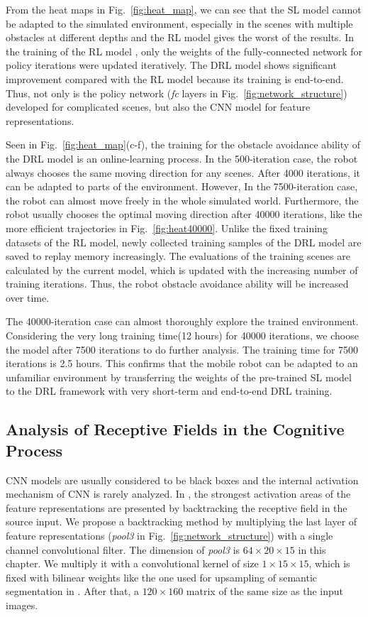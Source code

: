 From the heat maps in Fig.~\ref{fig:heat_map}, we can see that the SL model cannot be adapted to the simulated environment, especially in the scenes with multiple obstacles at different depths and the RL model gives the worst of the results. In the training of the RL model \cite{tl_rcar_2016}, only the weights of the fully-connected network for policy iterations were updated iteratively. The DRL model shows significant improvement compared with the RL model because its training is end-to-end. Thus, not only is the policy network (\textit{fc} layers in Fig.~\ref{fig:network_structure}) developed for complicated scenes, but also the CNN model for feature representations.


Seen in Fig.~\ref{fig:heat_map}(c-f), the training for the obstacle avoidance ability of the DRL model is an online-learning process. In the 500-iteration case, the robot always chooses the same moving direction for any scenes. After 4000 iterations, it can be adapted to parts of the environment. However, In the 7500-iteration case, the robot can almost move freely in the whole simulated world. Furthermore, the robot usually chooses the optimal moving direction after 40000 iterations, like the more efficient trajectories in Fig.~\ref{fig:heat40000}. Unlike the fixed training datasets of the RL model, newly collected training samples of the DRL model are saved to replay memory increasingly. The evaluations of the training scenes are calculated by the current model, which is updated with the increasing number of training iterations. Thus, the robot obstacle avoidance ability will be increased over time.

The 40000-iteration case can almost thoroughly explore the trained environment. Considering the very long training time(12 hours) for 40000 iterations, we choose the model after 7500 iterations to do further analysis. The training time for 7500 iterations is 2.5 hours. This confirms that the mobile robot can be adapted to an unfamiliar environment by transferring the weights of the pre-trained SL model to the DRL framework with very short-term and end-to-end DRL training.

\subsection{Analysis of Receptive Fields in the Cognitive Process}

CNN models are usually considered to be black boxes and the internal activation mechanism of CNN is rarely analyzed. In \cite{zeiler2014visualizing}, the strongest activation areas of the feature representations are presented by backtracking the receptive field in the source input. We propose a backtracking method by multiplying the last layer of feature representations (\textit{pool3} in Fig.~\ref{fig:network_structure}) with a single channel convolutional filter.  The dimension of \textit{pool3} is $64 \times 20 \times 15 $ in this chapter. We multiply it with a convolutional kernel of size $1 \times 15 \times 15$, which is fixed with bilinear weights like the one used for upsampling of semantic segmentation in \cite{long2015fully}. After that, a $120 \times 160$ matrix of the same size as the input images.

